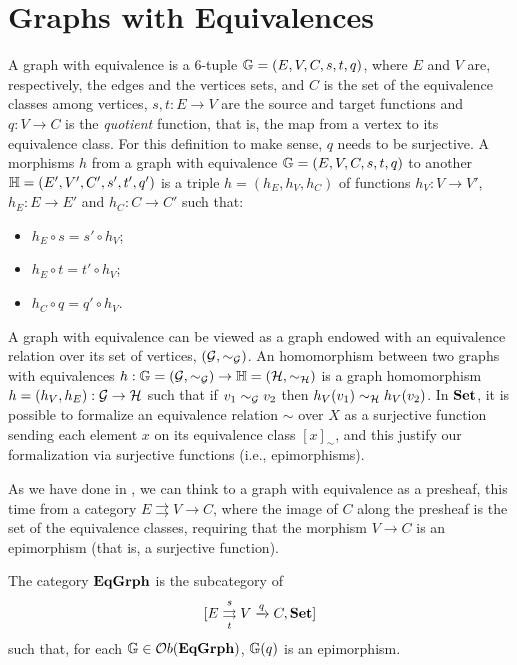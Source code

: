 \section{Graphs with Equivalences}\label{sect:eq_graphs}
A graph with equivalence is a 6-tuple $\mathbb{G} =  (E, V, C, s, t, q)$, where $E$ and $V$ are, respectively, the edges and the vertices sets, and $C$ is the set of the equivalence classes among vertices, $s,t : E \to V$ are the source and target functions and $q: V \to C$ is the \emph{quotient} function, that is, the map from a vertex to its equivalence class. For this definition to make sense, $q$ needs to be surjective. A morphisms $h$ from a graph with equivalence $\mathbb{G} =  (E, V, C, s, t, q)$ to another $\mathbb{H} = (E', V', C', s', t',  q')$ is a triple $h = (h_E, h_V, h_C)$ of functions $h_V : V \to V'$, $h_E : E \to E'$ and $h_C : C \to C'$ such that:
\begin{itemize}
    \item $h_E \circ s = s' \circ h_V$;
    \item $h_E \circ t = t' \circ h_V$;
    \item $h_C \circ q = q' \circ h_V$.
\end{itemize}

\begin{remark}
     A graph with equivalence can be viewed as a graph endowed with an equivalence relation over its set of vertices, $(\mathcal{G}, \sim_{\mathcal{G}})$. An homomorphism between two graphs with equivalences $h :\mathbb{G} = (\mathcal{G}, \sim_{\mathcal{G}})\rightarrow \mathbb{H} = (\mathcal{H}, \sim_{\mathcal{H}})$ is a graph homomorphism $h = (h_V, h_E):\mathcal{G} \rightarrow \mathcal{H}$ such that if $v_1 \sim_{\mathcal{G}} v_2$ then $h_V(v_1) \sim_{\mathcal{H}} h_V(v_2)$. In $\mathbf{Set}$, it is possible to formalize an equivalence relation $\sim$ over $X$ as a surjective function sending each element $x$ on its equivalence class $[x]_{\sim}$, and this justify our formalization via surjective functions (i.e., epimorphisms).
\end{remark}

As we have done in , we can think to a graph with equivalence as a presheaf, this time from a category $E \rightrightarrows V \rightarrow C$, where the image of $C$ along the presheaf is the set of the equivalence classes, requiring that the morphism $V\rightarrow C$ is an epimorphism (that is, a surjective function).

\begin{definition}\label{def:eq_grphs}
    The category $\mathbf{EqGrph}$ is the subcategory of $$[E \mathrel{\mathop{\rightrightarrows}^{s}_{t}} V \xrightarrow{q} C, \mathbf{Set}]$$ such that, for each $\mathbb{G} \in \mathcal{O}b(\mathbf{EqGrph})$, $\mathbb{G}(q)$ is an epimorphism. 
\end{definition}


